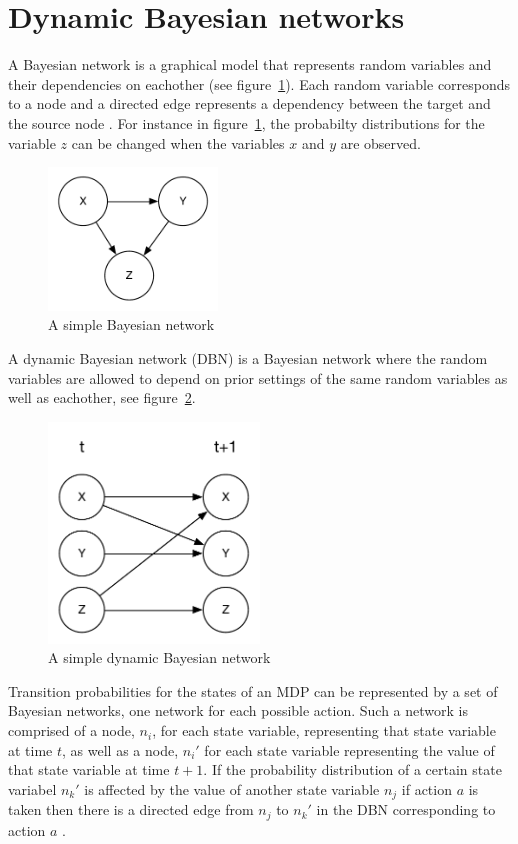 \section{Dynamic Bayesian networks}

A Bayesian network is a graphical model that represents random variables and their dependencies on eachother (see figure~\ref{fig:bn}). Each random variable corresponds to a node and a directed edge represents a dependency between the target and the source node \parencite{heckerman1998tutorial}. For instance in figure~\ref{fig:bn}, the probabilty distributions for the variable $z$ can be changed when the variables $x$ and $y$ are observed. 

\begin{figure}[H]
\centering
\includegraphics[width=0.4\textwidth]{images/BN.pdf}
\caption{A simple Bayesian network}
\label{fig:bn}
\end{figure}

A dynamic Bayesian network (DBN) is a Bayesian network where the random variables are allowed to depend on prior settings of the same random variables as well as eachother, see figure~\ref{fig:dbn}.

\begin{figure}[H]
    \centering
    \includegraphics[width=0.5\textwidth]{images/DBN.pdf}
    \caption{A simple dynamic Bayesian network}
    \label{fig:dbn}
\end{figure}

Transition probabilities for the states of an MDP can be represented by a set of Bayesian networks, one network for each possible action. Such a network is comprised of a node, $n_i$, for each state variable, representing that state variable at time $t$, as well as a node, $n_i'$ for each state variable representing the value of that state variable at time $t+1$. If the probability distribution of a certain state variabel $n_k'$ is affected by the value of another state variable $n_j$ if action $a$ is taken then there is a directed edge from $n_j$ to $n_k'$ in the DBN corresponding to action $a$ \parencite{guestrin2003efficient}.
